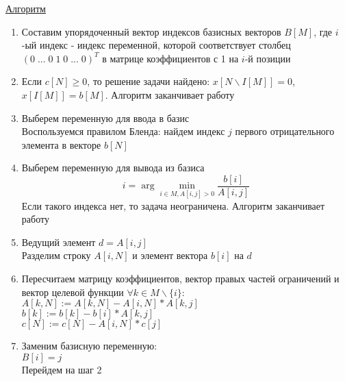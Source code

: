 \underline{Алгоритм}
\begin{enumerate}
	\item Составим упорядоченный вектор индексов базисных векторов $B[M]$, где $i$-ый индекс - индекс переменной, которой соответствует столбец $(0\;...\;0\;1\;0\;...\;0)^T$ в матрице коэффициентов с 1 на $i$-й позиции
	
	\item Если $c[N]\geq0$, то решение задачи найдено: $x[N \backslash I[M]]=0$, $x[I[M]]=b[M]$. Алгоритм заканчивает работу
	
	\item Выберем переменную для ввода в базис\\
	Воспользуемся правилом Бленда: найдем индекс $j$ первого отрицательного элемента в векторе $b[N]$
	
	\item Выберем переменную для вывода из базиса
	\begin{equation}
	i = \arg \min_{i \in M, A[i,j]>0} \frac{b[i]}{A[i,j]}
	\end{equation}
	Если такого индекса нет, то задача неограничена. Алгоритм заканчивает работу
	
	\item Ведущий элемент $d=A[i,j]$ \\
	Разделим строку $A[i,N]$ и элемент вектора $b[i]$ на $d$
	
	\item Пересчитаем матрицу коэффициентов, вектор правых частей ограничений и вектор целевой функции $\forall k \in M \backslash \{i\}$: \\
	$A[k,N] := A[k,N] - A[i,N] \ast A[k,j]$ \\
	$b[k] := b[k] - b[i] \ast A[k,j]$ \\
	$c[N] := c[N] - A[i,N] \ast c[j]$
	
	\item Заменим базисную переменную: \\
	$B[i] = j$ \\
	Перейдем на шаг 2
\end{enumerate}

